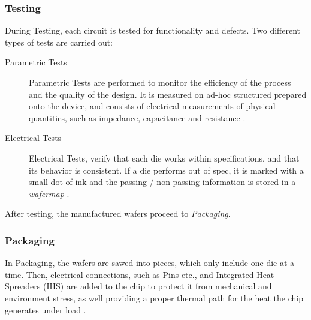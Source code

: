 \documentclass{Academic}
\begin{document}
    \subsubsection{Testing}
    During Testing, each circuit is tested for functionality and defects. Two different types of tests are carried out:
    \begin{description}
        \item[Parametric Tests] Parametric Tests are performed to monitor the efficiency of the process and the quality of the design. It is measured on ad-hoc structured prepared onto the device, and consists of electrical measurements of physical quantities, such as impedance, capacitance and resistance \cite{susto_automatic_2012}.
        \item[Electrical Tests] Electrical Tests, verify that each die works within specifications, and that its behavior is consistent. If a die performs out of spec, it is marked with a small dot of ink and the passing / non-passing information is stored in a \textit{wafermap} \cite{susto_automatic_2012}.
    \end{description}
    After testing, the manufactured wafers proceed to \textit{Packaging}.

    \subsubsection{Packaging}
    In Packaging, the wafers are sawed into pieces, which only include one die at a time. Then, electrical connections, such as Pins etc., and Integrated Heat Spreaders (IHS) are added to the chip to protect it from mechanical and environment stress, as well providing a proper thermal path for the heat the chip generates under load \cite{susto_automatic_2012}.
\end{document}

